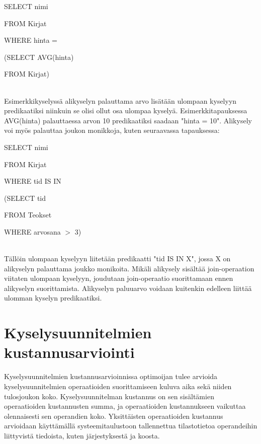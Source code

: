 \documentclass[finnish]{tktltiki2}
\theoremstyle{definition}
\theoremstyle{remark}
\begin{document}
\begin{frame}

SELECT nimi

FROM Kirjat

WHERE hinta = 

\hspace*{5mm}(SELECT AVG(hinta)
		
\hspace*{5mm}FROM Kirjat)
\end{frame}
\\\newline
Esimerkkikyselyssä alikyselyn palauttama arvo lisätään ulompaan kyselyyn predikaatiksi niinkuin se olisi ollut osa ulompaa kyselyä. Esimerkkitapauksessa AVG(hinta) palauttaessa arvon 10 predikaatiksi saadaan "hinta = 10". Alikysely voi myös palauttaa joukon monikkoja, kuten seuraavassa tapauksessa:
\newline

\begin{frame}

SELECT nimi

FROM Kirjat

WHERE tid IS IN 

\hspace*{5mm}(SELECT tid
		
\hspace*{5mm}FROM Teokset

\hspace*{5mm}WHERE arvosana $>$ 3)
\end{frame}
\\\newline
Tällöin ulompaan kyselyyn liitetään predikaatti "tid IS IN X", jossa X on alikyselyn palauttama joukko monikoita. Mikäli alikysely sisältää join-operaation viitaten ulompaan kyselyyn, joudutaan join-operaatio suorittamaan ennen alikyselyn suorittamista. Alikyselyn paluuarvo voidaan kuitenkin edelleen liittää ulomman kyselyn predikaatiksi.


\section{Kyselysuunnitelmien kustannusarviointi}
Kyselysuunnitelmien kustannusarvioinnissa optimoijan tulee arvioida kyselysuunnitelmien operaatioiden suorittamiseen kuluva aika sekä niiden tulosjoukon koko. Kyselysuunnitelman kustannus on sen sisältämien operaatioiden kustannusten summa, ja operaatioiden kustannukseen vaikuttaa olennaisesti sen operandien koko. Yksittäisten operaatioiden kustannus arvioidaan käyttämällä systeemitaulustoon tallennettua tilastotietoa operandeihin liittyvistä tiedoista, kuten järjestyksestä ja koosta. %
\end{document}
